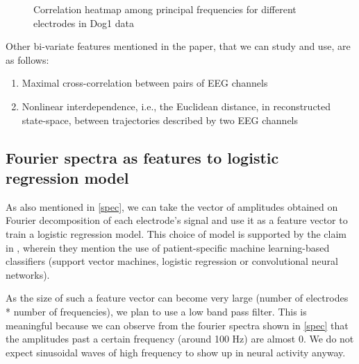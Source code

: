 \documentclass[a4paper]{article}
\begin{document}
\begin{figure}[H]
	\centering
	\qquad
	\caption{Correlation heatmap among principal frequencies for different electrodes in Dog1 data}
	\label{d1freqcorr}
\end{figure}

Other bi-variate features mentioned in the paper, that we can study and use, are as follows:
\begin{enumerate}
\item Maximal cross-correlation between pairs of EEG channels
\item Nonlinear interdependence, i.e., the Euclidean distance, in reconstructed state-space, between trajectories described by two EEG channels \cite{arnhold}
\end{enumerate}

\subsection{Fourier spectra as features to logistic regression model}
As also mentioned in \ref{spec}, we can take the vector of amplitudes obtained on Fourier decomposition of each electrode's signal and use it as a feature vector to train a logistic regression model. This choice of model is supported by the claim in \cite{lecun}, wherein they mention the use of patient-specific machine learning-based classifiers (support vector machines, logistic regression or convolutional neural networks). 

As the size of such a feature vector can become very large (number of electrodes * number of frequencies), we plan to use a low band pass filter. This is meaningful because we can observe from the fourier spectra shown in \ref{spec} that the amplitudes past a certain frequency (around 100 Hz) are almost 0. We do not expect sinusoidal waves of high frequency to show up in neural activity anyway.
\end{document}
